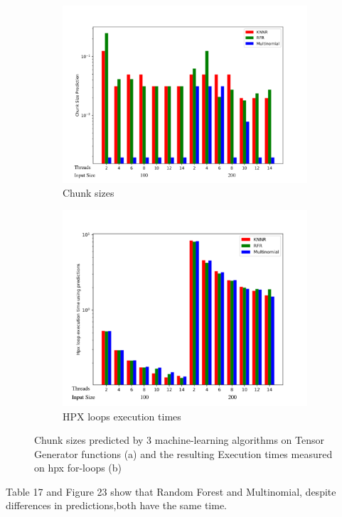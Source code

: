\begin{figure}[h]
	\centering
	\begin{subfigure}[b]{0.5\textwidth}
		\centering
		\includegraphics[width=\textwidth]{images/bars_tensor_cs.pdf}
		\caption[Network2]%
		{{Chunk sizes}}    
	\end{subfigure}
	\hfill
	\begin{subfigure}[b]{0.49\textwidth}  
		\centering 
		\includegraphics[width=\textwidth]{images/bars_tensor_times.pdf}
		\caption[]%
		{{HPX loops execution times}}    
	\end{subfigure}
	\caption{Chunk sizes predicted by 3 machine-learning algorithms on Tensor Generator functions (a) and the resulting Execution times measured on hpx for-loops (b)} 
\end{figure}
Table 17 and Figure 23 show that Random Forest and Multinomial, despite differences in predictions,both have the same time.